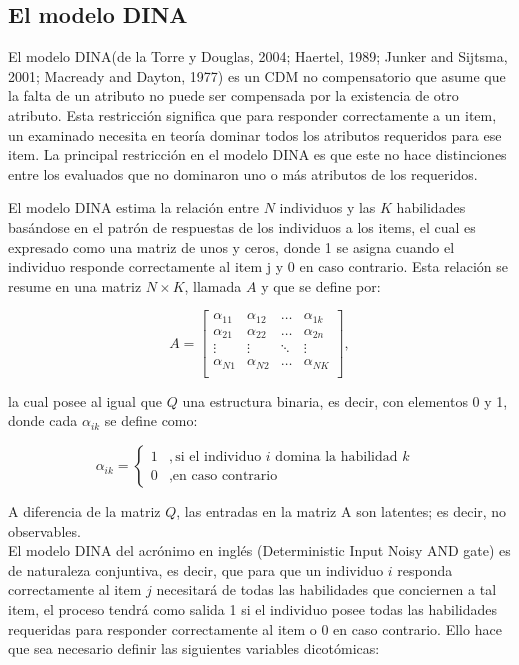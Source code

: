 		\subsection{El modelo DINA}
			El modelo DINA(de la Torre y Douglas, 2004; Haertel, 1989; Junker and Sijtsma, 2001; Macready and Dayton, 1977) es un CDM no compensatorio que asume que la falta de un atributo  no puede ser compensada por la existencia de otro atributo. Esta restricci\'{o}n significa que para responder correctamente a un item, un examinado necesita en teor\'{i}a dominar todos los atributos requeridos para ese item. La principal restricci\'{o}n en el modelo DINA es que este no hace distinciones entre los evaluados que no dominaron uno o m\'{a}s atributos de los requeridos.
			
			El modelo DINA estima la relaci\'{o}n entre $N$ individuos y las $K$ habilidades bas\'{a}ndose en el patr\'{o}n de respuestas de los individuos a los items, el cual es expresado como una matriz de unos y ceros, donde 1 se asigna cuando el individuo responde correctamente al item j y 0 en caso contrario. Esta relaci\'{o}n se resume en una matriz $N\times K$, llamada $A$ y que se define por:
			
			\begin{equation} 
				A = \left[ \begin{array}{cccc} 
					\alpha_{11} & \alpha_{12} & \ldots & \alpha_{1k} \\  
					\alpha_{21} & \alpha_{22} & \ldots & \alpha_{2n} \\    
					\vdots & \vdots & \ddots & \vdots \\
					\alpha_{N1} & \alpha_{N2} & \ldots & \alpha_{NK} \\    
				\end{array} \right], \label{2.24}
			\end{equation}
			
			la cual posee al igual que $Q$ una estructura binaria, es decir, con elementos 0 y 1, donde cada ${ \alpha  }_{ ik }$ se define como:
			
			\begin{equation}
				\alpha_{i k}=\left\{\begin{array}{cl}
							1 & ,\mbox{si el individuo $i$ domina la habilidad $k$ }\\
							0 & ,\mbox{en caso contrario}
						\end{array}\right. \label{2.25}
			\end{equation}
			
			A diferencia de la matriz $Q$, las entradas en la matriz A son latentes; es decir, no observables.\\    
			El modelo DINA del acr\'{o}nimo en ingl\'{e}s (Deterministic Input Noisy AND gate) es de naturaleza conjuntiva, es decir, que para que un individuo $i$ responda correctamente al item $j$ necesitar\'{a} de todas las habilidades que conciernen a tal item, el proceso tendr\'{a} como salida 1 si el individuo posee todas las habilidades requeridas para responder correctamente al item o 0 en caso contrario. Ello hace que sea necesario definir las siguientes variables dicot\'{o}micas:
			
